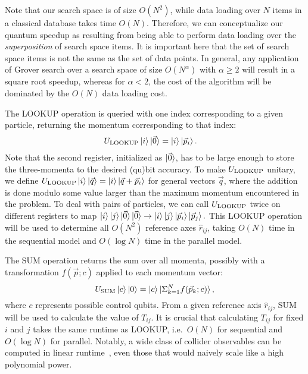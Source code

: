 \documentclass[aps,prd,twocolumn,superscriptaddress,preprintnumbers,nofootinbib,longbibliography,floatfix]{revtex4-1}
\begin{document}
Note that our search space is of size $O(N^2)$, while data loading over $N$ items in a classical database takes time $O(N)$.
%
Therefore, we can conceptualize our quantum speedup as resulting from being able to
perform data loading over the \emph{superposition} of search space items.
%
It is important here that the set of search space items is not the same as the set of data
points.  
%
In general, any application of Grover search over a search space of size $O(N^{\alpha})$ with $\alpha\geq2$ will result in a square root speedup, whereas for $\alpha<2$, the cost of the algorithm will be dominated by the $O(N)$ data loading cost.


The LOOKUP operation is queried with one index corresponding to a given particle, returning the momentum corresponding to that index:
%
\begin{align}
\label{eq:LOOKUP}
U_{\rm LOOKUP} \ket{i}\ket{\vec{0}}&=\ket{i}\ket{\vec{p}_i}.
\end{align}
%
Note that the second register, initialized as $\ket{\vec{0}}$, has to be large enough to store the three-momenta to the desired (qu)bit accuracy.
%
To make $U_{\rm LOOKUP}$ unitary, we define $U_{\rm LOOKUP} \ket{i}\ket{\vec q} = \ket i \ket{\vec q + \vec p_i}$ for general vectors $\vec q$, where the addition is done
modulo some value larger than the maximum momentum encountered in the problem.
%
To deal with pairs of particles, we can call $U_{\rm LOOKUP}$ twice on different registers to map $\ket{i} \ket{j} \ket{\vec{0}} \ket{\vec{0}} \to \ket{i} \ket{j} \ket{\vec{p}_i} \ket{\vec{p}_j}.$
%
This LOOKUP operation will be used to determine all $O(N^2)$ reference axes $\hat{r}_{ij}$, taking $O(N)$ time in the sequential model and $O(\log N)$ time in the parallel model.


The SUM operation returns the sum over all momenta, possibly with a transformation $f(\vec{p}; c)$ applied to each momentum vector:
%
\begin{equation}
U_{\rm SUM} \ket{c} \ket{0}= \ket{c} \ket{\Sigma_{k=1}^N f(\vec{p}_k; c)},
\end{equation}
%
where $c$ represents possible control qubits.
%
From a given reference axis $\hat{r}_{ij}$, SUM will be used to calculate the value of $T_{ij}$.
%
It is crucial that calculating $T_{ij}$ for fixed $i$ and $j$ takes the same runtime as LOOKUP, i.e.\ $O(N)$ for sequential and $O(\log N)$ for parallel.
%
Notably, a wide class of collider observables can be computed in linear runtime~\cite{toappearEFM}, even those that would naively scale like a high polynomial power.
\end{document}
